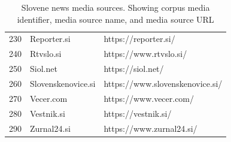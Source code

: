 \documentclass[10pt, a4paper]{article}
\begin{document}
\begin{table}[H]
\begin{center}
{{\begin{tabular}{lll}
        230&Reporter.si&https://reporter.si/\\
        240&Rtvslo.si&https://www.rtvslo.si/\\
        250&Siol.net&https://siol.net/\\
        260&Slovenskenovice.si&https://www.slovenskenovice.si/\\
        270&Vecer.com&https://www.vecer.com/\\
        280&Vestnik.si&https://vestnik.si/\\
        290&Zurnal24.si&https://www.zurnal24.si/\\
    \hline
  \end{tabular}}}
  \caption{Slovene news media sources. Showing corpus media identifier, media source name, and media source URL}
  \label{tab:slo_sources}
\end{center}
\end{table}
\end{document}
